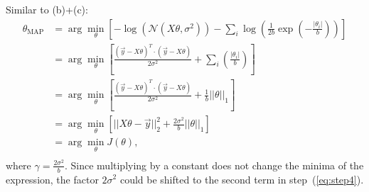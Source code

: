 \begin{answer}
    Similar to (b)+(c):
    \setcounter{equation}{0}
    \begin{align}
        \theta_{\text{MAP}}  &= \arg\min_\theta \left[-\log(\mathcal{N}(X\theta,\sigma^2))
         - \sum_i\log\left(\frac{1}{2b}\exp\left(-\frac{|\theta_i|}{b}\right)\right)\right] \\
         &= \arg\min_\theta \left[\frac{(\vec{y}-X\theta)^T\cdot(\vec{y}-X\theta)}{2\sigma^2}
         + \sum_i\left(\frac{|\theta_i|}{b}\right)\right] \\
         & = \arg\min_\theta \left[\frac{(\vec{y}-X\theta)^T\cdot(\vec{y}-X\theta)}{2\sigma^2}
         + \frac{1}{b}||\theta||_1\right] \\
         & = \arg\min_\theta \left[||X\theta-\vec{y}||^2_2
         + \frac{2\sigma^2}{b}||\theta||_1\right]\label{eq:step4} \\
         & = \arg\min_\theta J(\theta), \\
    \end{align}
    where $\gamma = \frac{2\sigma^2}{b}$.
Since multiplying by a constant does not change the minima of the expression, the factor $2\sigma^2$ could be shifted to the second term in step~(\ref{eq:step4}).
\end{answer}
